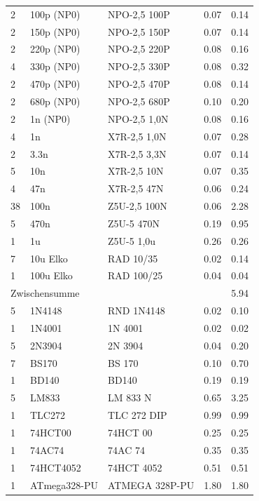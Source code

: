 \documentclass[10pt, a4paper]{paper}
\begin{document}
\begin{longtable}{|p{}|p{}|p{}|p{}|p{}|}
 2 & 100p (NP0)   & NPO-2,5 100P    & 0.07  & 0.14 \\
 2 & 150p (NP0)   & NPO-2,5 150P    & 0.07  & 0.14 \\
 2 & 220p (NP0)   & NPO-2,5 220P    & 0.08  & 0.16 \\
 4 & 330p (NP0)   & NPO-2,5 330P    & 0.08  & 0.32 \\
 2 & 470p (NP0)   & NPO-2,5 470P    & 0.08  & 0.14 \\
 2 & 680p (NP0)   & NPO-2,5 680P    & 0.10  & 0.20 \\
 2 & 1n   (NP0)   & NPO-2,5 1,0N    & 0.08  & 0.16 \\
 4 & 1n           & X7R-2,5 1,0N    & 0.07  & 0.28 \\
 2 & 3.3n         & X7R-2,5 3,3N    & 0.07  & 0.14 \\
 5 & 10n          & X7R-2,5 10N     & 0.07  & 0.35 \\
 4 & 47n          & X7R-2,5 47N     & 0.06  & 0.24 \\
38 & 100n         & Z5U-2,5 100N    & 0.06  & 2.28 \\
 5 & 470n         & Z5U-5 470N      & 0.19  & 0.95 \\
 1 & 1u           & Z5U-5 1,0u      & 0.26  & 0.26 \\
 7 & 10u Elko     & RAD 10/35       & 0.02  & 0.14 \\
 1 & 100u Elko    & RAD 100/25      & 0.04  & 0.04 \\ \hline
 \multicolumn{4}{|l|}{Zwischensumme}        & 5.94 \\ \hline 
 5 & 1N4148       & RND 1N4148      & 0.02  & 0.10 \\
 1 & 1N4001       & 1N 4001         & 0.02  & 0.02 \\ 
 5 & 2N3904       & 2N 3904         & 0.04  & 0.20 \\ 
 7 & BS170        & BS 170          & 0.10  & 0.70 \\
 1 & BD140        & BD140           & 0.19  & 0.19 \\
 5 & LM833        & LM 833 N        & 0.65  & 3.25 \\
 1 & TLC272       & TLC 272 DIP     & 0.99  & 0.99 \\
 1 & 74HCT00      & 74HCT 00        & 0.25  & 0.25 \\
 1 & 74AC74       & 74AC 74         & 0.35  & 0.35 \\
 1 & 74HCT4052    & 74HCT 4052      & 0.51  & 0.51 \\
 1 & ATmega328-PU & ATMEGA 328P-PU  & 1.80  & 1.80 \\

\end{longtable}
\end{document}
